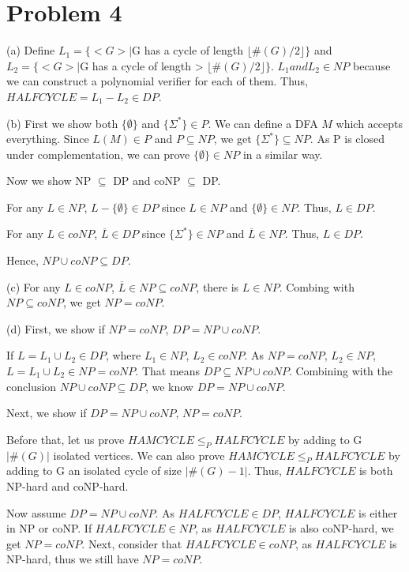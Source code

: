 \documentclass[paper=a4, fontsize=12pt]{scrartcl} %
\numberwithin{equation}{section} %
\numberwithin{figure}{section} %
\numberwithin{table}{section} %
\begin{document}
\section*{Problem 4} 
(a) \quad Define $L_1 = \{<G>|$G has a cycle of length \geq $\lfloor \#(G)/2 \rfloor \}$ and $L_2 = \{<G>|$G has a cycle of length > $\lfloor \#(G)/2 \rfloor \}$. $L_1 and L_2\in NP$ because we can construct a polynomial verifier for each of them.   
Thus, $HALFCYCLE = L_1 - L_2 \in DP$.

(b) \quad First we show both $\{\emptyset\}$ and $\{\Sigma^*\} \in P$. We can define a DFA $M$ which accepts everything. Since $L(M) \in P$ and $P \subseteq NP$, we get $\{\Sigma^*\} \subseteq NP$. As P is closed under complementation, we can prove $\{\emptyset\} \in NP$ in a similar way.  \par
Now we show NP $\subseteq$ DP and coNP $\subseteq$ DP. \par
For any $L \in NP$, $L - \{\emptyset\} \in DP$ since $L \in NP$ and $\{\emptyset\} \in NP$. Thus, $L \in DP$. \par 

For any $L \in coNP$, $\overline{L} \in DP$ since $\{\Sigma^*\} \in NP$ and $\overline{L} \in NP$. Thus, $L \in DP$. \par 
Hence, $NP \cup coNP \subseteq DP$.

(c) \quad For any $L \in coNP$, $\overline{L} \in NP \subseteq coNP$, there is $L \in NP$. Combing with $NP \subseteq coNP$, we get $NP = coNP$. 

(d) \quad First, we show if $NP = coNP$, $DP = NP \cup coNP$. \par
If $L = L_1 \cup L_2 \in DP$, where $L_1 \in NP$, $L_2 \in coNP$. As $NP = coNP$, $L_2 \in NP$, $L = L_1 \cup L_2 \in NP = coNP$. That means $DP \subseteq NP \cup coNP$. Combining with the conclusion $NP \cup coNP \subseteq DP$, we know $DP = NP \cup coNP$. \par
Next, we show if $DP = NP \cup coNP$, $NP = coNP$. \par
Before that, let us prove $HAMCYCLE \leq_P HALFCYCLE$ by adding to G $|\#(G)|$ isolated vertices. We can also prove $\overline{HAMCYCLE} \leq_P HALFCYCLE$ by adding to G an isolated cycle of size $|\#(G)-1|$. Thus, $HALFCYCLE$ is both NP-hard and coNP-hard.\par
Now assume $DP = NP \cup coNP$. As $HALFCYCLE \in DP$, $HALFCYCLE$ is either in NP or coNP. If $HALFCYCLE \in NP$, as $HALFCYCLE$ is also coNP-hard, we get $NP = coNP$. Next, consider that $HALFCYCLE \in coNP$, as $HALFCYCLE$ is NP-hard, thus we still have $NP = coNP$. 
\end{document}
